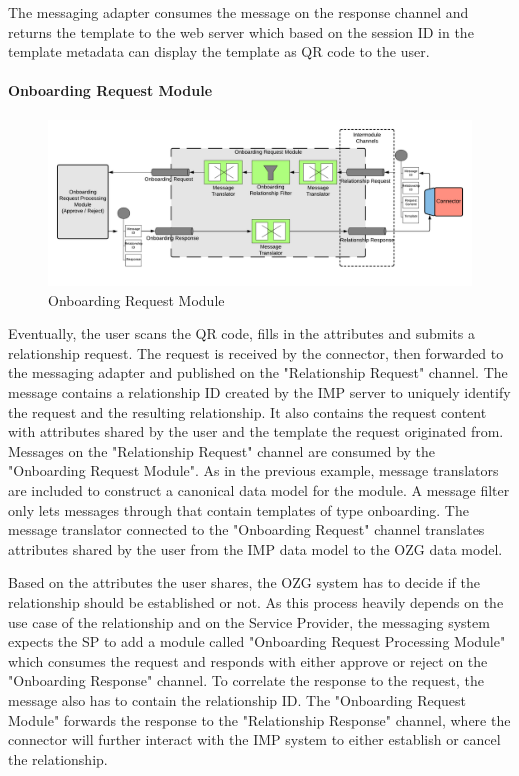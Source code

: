 The messaging adapter consumes the message on the response channel and returns the template to the web server which based on the session ID in the template metadata can display the template as QR code to the user.

\paragraph{Onboarding Request Module}

\begin{figure}[H]
    \centering
    \includegraphics[scale=0.6]{Diagrams/Integration Architecture 1/Technological Integration/7. Onboarding Request Module.pdf}
    \caption{Onboarding Request Module}
    \label{integration1:onboarding_request_module}
\end{figure}

Eventually, the user scans the QR code, fills in the attributes and submits a relationship request. The request is received by the connector, then forwarded to the messaging adapter and published on the "Relationship Request" channel. The message contains a relationship ID created by the IMP server to uniquely identify the request and the resulting relationship. It also contains the request content with attributes shared by the user and the template the request originated from. Messages on the "Relationship Request" channel are consumed by the "Onboarding Request Module". As in the previous example, message translators are included to construct a canonical data model for the module. A message filter only lets messages through that contain templates of type onboarding. The message translator connected to the "Onboarding Request" channel translates attributes shared by the user from the IMP data model to the OZG data model.

Based on the attributes the user shares, the OZG system has to decide if the relationship should be established or not. As this process heavily depends on the use case of the relationship and on the Service Provider, the messaging system expects the SP to add a module called "Onboarding Request Processing Module" which consumes the request and responds with either approve or reject on the "Onboarding Response" channel. To correlate the response to the request, the message also has to contain the relationship ID. The "Onboarding Request Module" forwards the response to the "Relationship Response" channel, where the connector will further interact with the IMP system to either establish or cancel the relationship.

